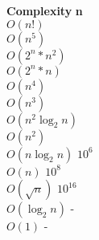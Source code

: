 \documentclass[10pt,letterpaper,twocolumn,twosided]{article}
\begin{document}
\begin{tabbing}
\textbf{Complexity}\hspace{4cm} \=  \textbf{n}\hspace{3cm}   \\ 
$O(n!)$ \\ 
$O(n^{5})$ \\ 
$O(2^{n}*n^{2})$ \\ 
$O(2^{n}*n)$ \\ 
$O(n^{4})$ \\ 
$O(n^{3})$ \\ 
$O(n^{2}\log_{2}n)$ \\ 
$O(n^{2})$ \\ 
$O(n\log_{2}n)$ \> $10^{6}$\\ 
$O(n)$ \> $10^{8}$\\ 
$O(\sqrt{n})$ \> $10^{16}$\\ 
$O(\log_{2}n)$ \> -\\ 
$O(1)$ \> -\\ 
\end{tabbing}
\end{document}
